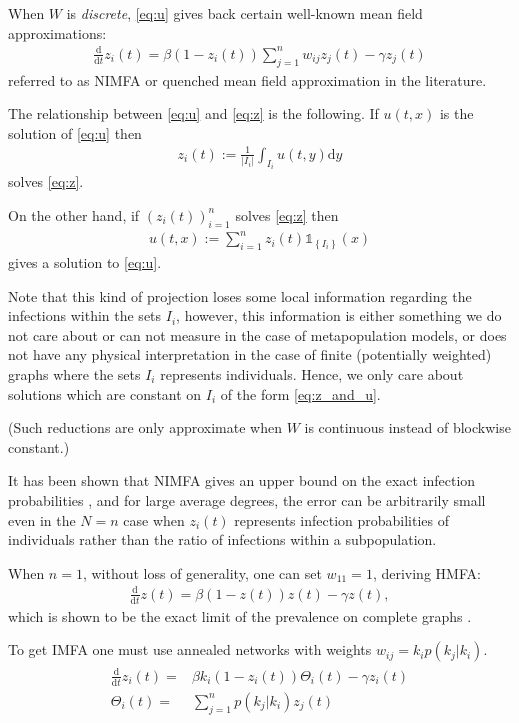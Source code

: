 \documentclass{article}
\renewcommand{\d}{\mathrm{d}}
\newcommand{\1}[1]{{\mathds{1}}_{\left\{#1\right\}}}
\newcommand{\rem}[1]{{#1}}
\begin{document}
\rem{When $W$ is \emph{discrete}, \eqref{eq:u} gives back certain well-known mean field approximations:
\begin{align}
	\label{eq:z}
	\frac{\d}{\d t}z_i(t)=\beta(1-z_i(t))\sum_{j=1}^{n}w_{ij}z_j(t)-\gamma z_j(t)
\end{align} 
referred to as  NIMFA or quenched mean field approximation in the literature. 

The relationship between \eqref{eq:u} and \eqref{eq:z} is the following. If $u(t,x)$ is the solution of \eqref{eq:u} then	
\begin{align}
\label{eq:u_and_z}
z_i(t):=\frac{1}{|I_i|} \int_{I_i}u(t,y) \d y
\end{align}
solves \eqref{eq:z}.

On the other hand, if $(z_i(t))_{i=1}^n$ solves \eqref{eq:z} then
\begin{align}
\label{eq:z_and_u}
u(t,x):=\sum_{i =1}^n z_i(t) \1{I_i}(x)
\end{align}
gives a solution to \eqref{eq:u}.

Note that this kind of projection loses some local information regarding the infections within the sets $I_i$, however, this information is either something we do not care about or can not measure in the case of metapopulation models, or does not have any physical interpretation in the case of finite (potentially weighted) graphs where the sets $I_i$ represents individuals. Hence, we only care about solutions which are constant on $I_i$ of the form \eqref{eq:z_and_u}.

(Such reductions are only approximate when $W$ is continuous instead of blockwise constant.) 
}
It has been shown that NIMFA gives an upper bound on the exact infection probabilities \cite{simon2017NIMFA,Mieghem2014}, and for large average degrees, the error can be arbitrarily small \cite{Sridhar_Kar1, Sridhar_Kar2,NIMFA_sajat} \rem{even in the $N=n$ case when $z_i(t)$ represents infection probabilities of individuals rather than the ratio of infections within a subpopulation.}

When $n=1$, without loss of generality, one can set $w_{11}=1$, deriving HMFA:
\begin{align*}
\frac{\d}{\d t} z(t)=\beta(1-z(t))z(t)-\gamma z(t),
\end{align*}
which is shown to be the exact limit of the prevalence on complete graphs \cite{kurtz70}.

To get IMFA \cite{vesp} one must use annealed networks with weights $w_{ij}=k_ip(k_j|k_i).$
\begin{align}
\label{eq:IMFA}
\begin{split}
\frac{\d}{\d t}z_i(t)=&\beta k_i (1-z_i(t))\Theta_i(t)-\gamma z_i(t)\\
\Theta_i(t)=& \sum_{j=1}^{n} p(k_j|k_i)z_j(t)
\end{split}
\end{align} 
\end{document}
